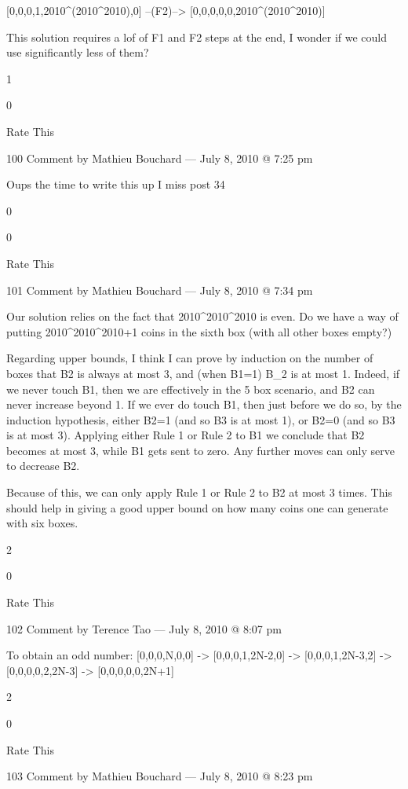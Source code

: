 {    [0,0,0,1,2010^(2010^2010),0] –(F2)–> [0,0,0,0,0,2010^(2010^2010)]

    This solution requires a lof of F1 and F2 steps at the end, I wonder if we could use significantly less of them?
     
    1
     
    0
     
    Rate This

    100 Comment by Mathieu Bouchard — July 8, 2010 @ 7:25 pm

        Oups the time to write this up I miss post 34
         
        0
         
        0
         
        Rate This

        101  Comment by Mathieu Bouchard — July 8, 2010 @ 7:34 pm

    Our solution relies on the fact that 2010^{2010^{2010}} is even. Do we have a way of putting 2010^{2010^{2010}}+1 coins in the sixth box (with all other boxes empty?)

    Regarding upper bounds, I think I can prove by induction on the number of boxes that B2 is always at most 3, and (when B1=1) B_2 is at most 1. Indeed, if we never touch B1, then we are effectively in the 5 box scenario, and B2 can never increase beyond 1. If we ever do touch B1, then just before we do so, by the induction hypothesis, either B2=1 (and so B3 is at most 1), or B2=0 (and so B3 is at most 3). Applying either Rule 1 or Rule 2 to B1 we conclude that B2 becomes at most 3, while B1 gets sent to zero. Any further moves can only serve to decrease B2.

    Because of this, we can only apply Rule 1 or Rule 2 to B2 at most 3 times. This should help in giving a good upper bound on how many coins one can generate with six boxes.
     
    2
     
    0
     
    Rate This

    102 Comment by Terence Tao — July 8, 2010 @ 8:07 pm

        To obtain an odd number: [0,0,0,N,0,0] -> [0,0,0,1,2N-2,0] -> [0,0,0,1,2N-3,2] -> [0,0,0,0,2,2N-3] -> [0,0,0,0,0,2N+1]
         
        2
         
        0
         
        Rate This

        103 Comment by Mathieu Bouchard — July 8, 2010 @ 8:23 pm

}
